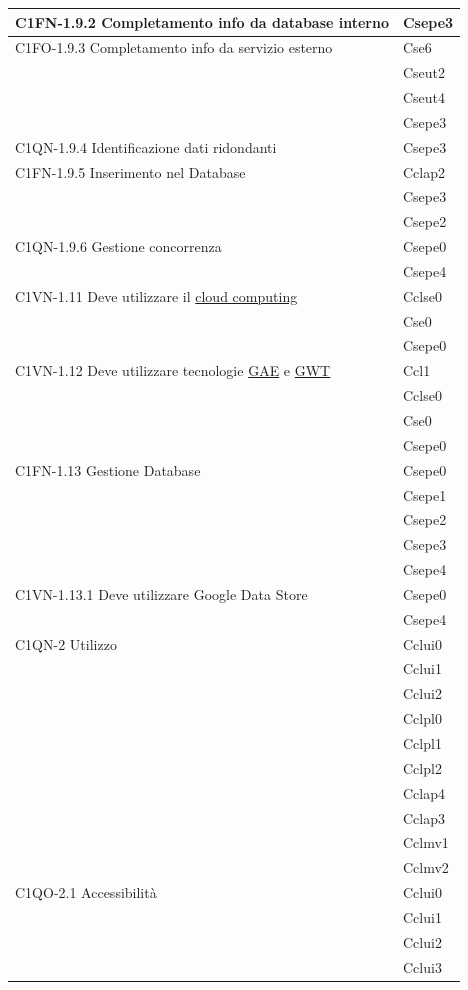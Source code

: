 \begin{footnotesize}
\begin{longtable}[!h]{|l|l|}
C1FN-1.9.2 Completamento info da database interno & Csepe3 \\\hline   
C1FO-1.9.3 Completamento info da servizio esterno & Cse6\\
& Cseut2\\
& Cseut4\\
& Csepe3\\\hline  
C1QN-1.9.4 Identificazione dati ridondanti & Csepe3\\\hline                                                                                       
C1FN-1.9.5 Inserimento nel Database & Cclap2\\
& Csepe3\\
& Csepe2\\\hline  
C1QN-1.9.6 Gestione concorrenza & Csepe0\\
& Csepe4\\\hline    
C1VN-1.11 Deve utilizzare il \underline{cloud computing} & Cclse0\\
& Cse0\\
& Csepe0\\\hline    
C1VN-1.12 Deve utilizzare tecnologie \underline{GAE} e \underline{GWT} & Ccl1\\
& Cclse0\\
& Cse0\\
& Csepe0\\\hline                                 
C1FN-1.13 Gestione Database & Csepe0\\
& Csepe1\\
& Csepe2\\
& Csepe3\\
& Csepe4\\\hline   
C1VN-1.13.1 Deve utilizzare Google Data Store & Csepe0\\
& Csepe4\\\hline      
C1QN-2 Utilizzo & Cclui0 \\
& Cclui1\\
& Cclui2\\
& Cclpl0\\
& Cclpl1\\
& Cclpl2\\
& Cclap4\\
& Cclap3\\
& Cclmv1\\
& Cclmv2\\\hline  
C1QO-2.1 Accessibilit\`a & Cclui0\\
& Cclui1\\
& Cclui2\\
& Cclui3\\

\end{longtable}
\end{footnotesize}
